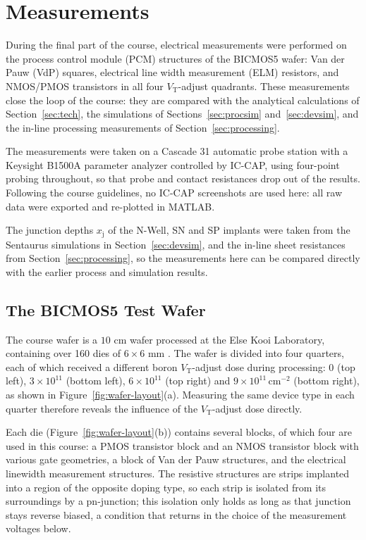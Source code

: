 \section{Measurements}
\label{sec:meas}

During the final part of the course, electrical measurements were performed on the process control module (PCM) structures of the BICMOS5 wafer: Van der Pauw (VdP) squares, electrical line width measurement (ELM) resistors, and NMOS/PMOS transistors in all four $V_\mathrm{T}$-adjust quadrants. These measurements close the loop of the course: they are compared with the analytical calculations of Section~\ref{sec:tech}, the simulations of Sections~\ref{sec:procsim} and~\ref{sec:devsim}, and the in-line processing measurements of Section~\ref{sec:processing}.

The measurements were taken on a Cascade 31 automatic probe station with a Keysight B1500A parameter analyzer controlled by IC-CAP, using four-point probing throughout, so that probe and contact resistances drop out of the results. Following the course guidelines, no IC-CAP screenshots are used here: all raw data were exported and re-plotted in MATLAB.

The junction depths $x_\mathrm{j}$ of the N-Well, SN and SP implants were taken from the Sentaurus simulations in Section~\ref{sec:devsim}, and the in-line sheet resistances from Section~\ref{sec:processing}, so the measurements here can be compared directly with the earlier process and simulation results.

\subsection{The BICMOS5 Test Wafer}

The course wafer is a $10$ cm wafer processed at the Else Kooi Laboratory, containing over 160 dies of $6\times6$ mm \cite{et4icp_manual}. The wafer is divided into four quarters, each of which received a different boron $V_\mathrm{T}$-adjust dose during processing: $0$ (top left), $3\times10^{11}$ (bottom left), $6\times10^{11}$ (top right) and $9\times10^{11}\,\mathrm{cm}^{-2}$ (bottom right), as shown in Figure~\ref{fig:wafer-layout}(a). Measuring the same device type in each quarter therefore reveals the influence of the $V_\mathrm{T}$-adjust dose directly.

Each die (Figure~\ref{fig:wafer-layout}(b)) contains several blocks, of which four are used in this course: a PMOS transistor block and an NMOS transistor block with various gate geometries, a block of Van der Pauw structures, and the electrical linewidth measurement structures. The resistive structures are strips implanted into a region of the opposite doping type, so each strip is isolated from its surroundings by a pn-junction; this isolation only holds as long as that junction stays reverse biased, a condition that returns in the choice of the measurement voltages below.

